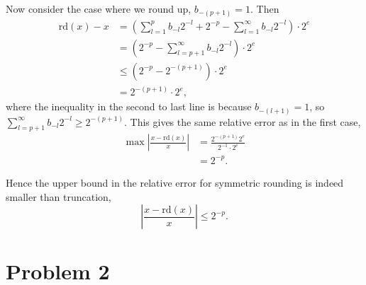 \documentclass[12pt]{article}
\begin{document}
Now consider the case where we round up, $b_{-(p+1)} = 1$. Then
\begin{equation*}
\begin{aligned}
\mathrm{rd}(x) - x &= \left(\sum_{l=1}^p b_{-l} 2^{-l} + 2^{-p} - \sum_{l=1}^\infty b_{-l} 2^{-l}\right)\cdot 2^e \\
&= \left( 2^{-p} - \sum_{l=p+1}^\infty b_{-l} 2^{-l}\right)\cdot 2^e \\
&\leq \left(2^{-p} - 2^{-(p+1)}\right)\cdot 2^e \\
&= 2^{-(p+1)}\cdot 2^e,
\end{aligned}
\end{equation*}
where the inequality in the second to last line is because $b_{-(l+1)} = 1$, so $\sum_{l=p+1}^\infty b_{-l}2^{-l} \geq 2^{-(p+1)}$. This gives the same relative error as in the first case,
\begin{equation*}
\begin{aligned}
\max \left|\frac{x - \mathrm{rd}(x)}{x}\right| &= \frac{2^{-(p+1)}2^e}{2^{-1}\cdot2^e} \\
&= 2^{-p}.
\end{aligned}
\end{equation*}

Hence the upper bound in the relative error for symmetric rounding is indeed smaller than truncation,
\begin{equation*}
\left|\frac{x-\mathrm{rd}(x)}{x}\right| \leq 2^{-p}.
\end{equation*}

\section*{Problem 2}
\end{document}
